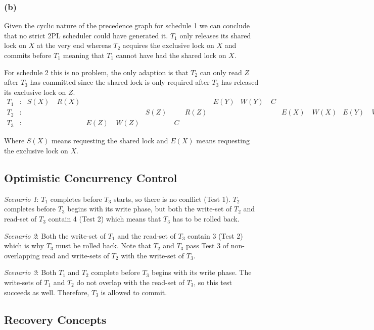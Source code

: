\documentclass[a4paper,11pt]{article}
\begin{document}
\subsubsection*{(b)}
Given the cyclic nature of the precedence graph for schedule 1 we can conclude that no strict 2PL scheduler could have generated it. \(T_1\) only releases its shared lock on \(X\) at the very end whereas \(T_2\) acquires the exclusive lock on \(X\) and commits before \(T_1\) meaning that \(T_1\) cannot have had the shared lock on \(X\).

For schedule 2 this is no problem, the only adaption is that \(T_2\) can only read \(Z\) after \(T_3\) has committed since the shared lock is only required after \(T_3\) has released its exclusive lock on \(Z\).
\begin{align*}
  T_1&: &S(X)~&R(X) &     &     &     &  &     &E(Y) &W(Y)~&C &     &     &     &     &\\
  T_2&: &     &     &     &     &S(Z)~&  &R(Z) &     &     &  &E(X)~&W(X) &E(Y)~&W(Y) &C\\
  T_3&: &     &     &E(Z)~&W(Z) &     &C &     &     &     &  &     &     &     &     &
\end{align*}

Where \(S(X)\) means requesting the shared lock and \(E(X)\) means requesting the exclusive lock on \(X\).

\subsection{Optimistic Concurrency Control}
\label{sec:ex2}
\emph{Scenario 1}: \(T_1\) completes before \(T_3\) starts, so there is no conflict (Test 1). \(T_2\) completes before \(T_3\) begins with its write phase, but both the write-set of \(T_2\) and read-set of \(T_3\) contain 4 (Test 2) which means that \(T_3\) has to be rolled back.

\noindent \emph{Scenario 2}: Both the write-set of \(T_1\) and the read-set of \(T_3\) contain 3 (Test 2) which is why \(T_3\) must be rolled back. Note that \(T_2\) and \(T_3\) pass Test 3 of non-overlapping read and write-sets of \(T_2\) with the write-set of \(T_3\).

\noindent \emph{Scenario 3}: Both \(T_1\) and \(T_2\) complete before \(T_3\) begins with its write phase. The write-sets of \(T_1\) and \(T_2\) do not overlap with the read-set of \(T_3\), so this test succeeds as well. Therefore, \(T_3\) is allowed to commit.

\subsection{Recovery Concepts}
\label{sec:ex3}
\end{document}
